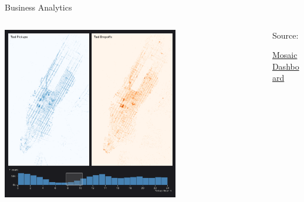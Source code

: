 \documentclass[aspectratio=169,t,11pt,table]{beamer}
\begin{document}
\begin{frame}{Business Analytics}
  \begin{columns}[T]
    \begin{column}{.7\textwidth}\vspace*{-1.5\bigskipamount}
      \begin{center}
        \includegraphics[width = 0.67\textwidth]{figures/nyc_taxis.png}
      \end{center}
    \end{column}
    \begin{column}{.3\textwidth}
      Source:

      \href{https://idl.uw.edu/mosaic/examples/nyc-taxi-rides.html}{Mosaic Dashboard}
    \end{column}
  \end{columns}
\end{frame}
\end{document}

